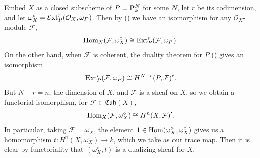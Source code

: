 {\Proof Embed $X$ as a closed subscheme of $P=\mathbf{P}_k^N$ for some $N$, let $r$ be its codimension, and let $\omega_X^\circ=\operatorname{\mathcal E xt}_P^r(\mathcal O_X,\omega_P)$. Then by () we have an isomorphism for any $\mathcal O_X$-module $\mathcal F$,
\[
\operatorname{Hom}_X(\mathcal F,\omega_X^\circ)\cong\operatorname{Ext}_P^r(\mathcal F,\omega_P).
\]
\noindent On the other hand, when $\mathcal F$ is coherent, the duality theorem for $P$ () gives an isomorphism
\[
\operatorname{Ext}_P^r(\mathcal F,\omega_P)\cong H^{N-r}(P,\mathcal F)'.
\]
\noindent But $N-r=n$, the dimension of $X$, and $\mathcal F$ is a sheaf on $X$, so we obtain a functorial isomorphism, for $\mathcal F\in\mathfrak{Coh}(X)$,
\[
\operatorname{Hom}_X(\mathcal F,\omega_X^\circ)\cong H^n(X,\mathcal F)'.
\]
\noindent In particular, taking $\mathcal F=\omega_X^\circ$, the element $1\in\operatorname{Hom}(\omega_X^\circ,\omega_X^\circ)$ gives us a homomorphism $t\colon H^n(X,\omega_X^\circ)\to k$, which we take as our trace map. Then it is clear by functoriality that $(\omega_X^\circ,t)$ is a dualizing sheaf for $X$.
}
